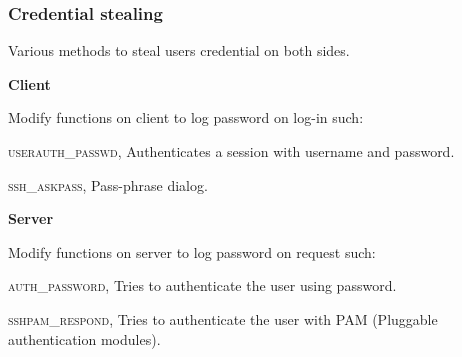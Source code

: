 \begin{frame}
	\frametitle{Credential stealing}

  Various methods to steal users credential on both sides. 

  \bigskip

	\textbf{Client}

  \smallskip

  Modify functions on client to log password on log-in such:

  \smallskip

  \textsc{userauth\_passwd}, Authenticates a session with username and password.

  \smallskip

  \textsc{ssh\_askpass}, Pass-phrase dialog.

  \bigskip

	\textbf{Server}

  \smallskip

  Modify functions on server to log password on request such:
  
  \smallskip

  \textsc{auth\_password}, Tries to authenticate the user using password.

  \smallskip

  \textsc{sshpam\_respond}, Tries to authenticate the user with PAM (Pluggable authentication modules).


\end{frame}


